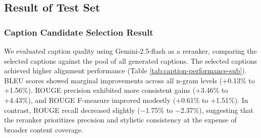 \documentclass{article} %
\begin{document}
 \subsection{Result of Test Set}

 \subsubsection{Caption Candidate Selection Result}
We evaluated caption quality using Gemini-2.5-flash as a reranker, comparing the selected captions against the pool of all generated captions. The selected captions achieved higher alignment performance (Table \ref{tab:caption-performance-sub}). BLEU scores showed marginal improvements across all n-gram levels (+0.13\% to +1.56\%). ROUGE precision exhibited more consistent gains (+3.46\% to +4.43\%), and ROUGE F-measure improved modestly (+0.61\% to +1.51\%). In contrast, ROUGE recall decreased slightly (−1.75\% to −2.37\%), suggesting that the reranker prioritizes precision and stylistic consistency at the expense of broader content coverage.
\end{document}
